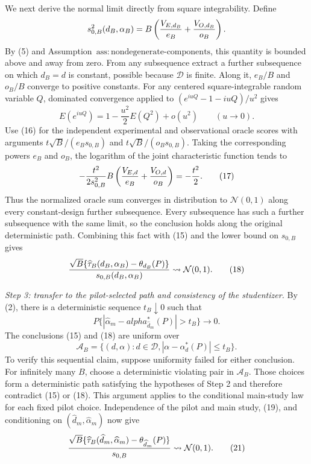 We next derive the normal limit directly from square integrability.  Define
\[
 s_{0,B}^2(d_B,\alpha_B)
 =B\left({V_{E,d_B}\over e_B}+{V_{O,d_B}\over o_B}\right).
\]
By (5) and Assumption~\(\mathrm{ass{:}nondegenerate\text{-}components}\), this quantity is bounded above and away from zero.  From any subsequence extract a further subsequence on which \(d_B=d\) is constant, possible because \(\mathcal D\) is finite.  Along it, \(e_B/B\) and \(o_B/B\) converge to positive constants.  For any centered square-integrable random variable \(Q\), dominated convergence applied to
\((e^{iuQ}-1-iuQ)/u^2\) gives
\[
 E(e^{iuQ})=1-\frac{u^2}{2}E(Q^2)+o(u^2)
 \qquad(u\to0). \tag{16}
\]
Use (16) for the independent experimental and observational oracle scores with arguments
\(t\sqrt B/(e_Bs_{0,B})\) and \(t\sqrt B/(o_Bs_{0,B})\).  Taking the corresponding powers \(e_B\) and \(o_B\), the logarithm of the joint characteristic function tends to
\[
 -{t^2\over2s_{0,B}^2}
 B\left({V_{E,d}\over e_B}+{V_{O,d}\over o_B}\right)
 =-{t^2\over2}. \tag{17}
\]
Thus the normalized oracle sum converges in distribution to \(\mathcal N(0,1)\) along every constant-design further subsequence.  Every subsequence has such a further subsequence with the same limit, so the conclusion holds along the original deterministic path.  Combining this fact with (15) and the lower bound on \(s_{0,B}\) gives
\[
 {\sqrt B\{\widehat\tau_B(d_B,\alpha_B)-\theta_{d_B}(P)\}
  \over s_{0,B}(d_B,\alpha_B)}
 \rightsquigarrow\mathcal N(0,1). \tag{18}
\]

\emph{Step 3: transfer to the pilot-selected path and consistency of the studentizer.}
By (2), there is a deterministic sequence \(t_B\downarrow0\) such that
\[
 P\bigl\{|\widehat\alpha_m-alpha_{\widehat d_m}^*(P)|>t_B\bigr\}
 \longrightarrow0. \tag{19}
\]
The conclusions (15) and (18) are uniform over
\[
 \mathcal A_B=
 \{(d,\alpha):d\in\mathcal D,
 |\alpha-\alpha_d^*(P)|\le t_B\}. \tag{20}
\]
To verify this sequential claim, suppose uniformity failed for either conclusion.  For infinitely many \(B\), choose a deterministic violating pair in \(\mathcal A_B\).  Those choices form a deterministic path satisfying the hypotheses of Step 2 and therefore contradict (15) or (18).  This argument applies to the conditional main-study law for each fixed pilot choice.  Independence of the pilot and main study, (19), and conditioning on \((\widehat d_m,\widehat\alpha_m)\) now give
\[
 {\sqrt B\{\widehat\tau_B(\widehat d_m,\widehat\alpha_m)
              -\theta_{\widehat d_m}(P)\}\over s_{0,B}}
 \rightsquigarrow\mathcal N(0,1). \tag{21}
\]

